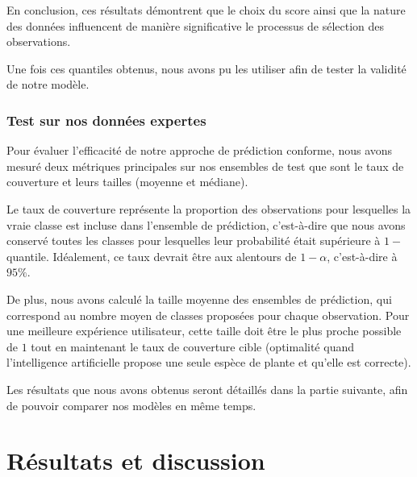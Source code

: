 \documentclass[a4paper,12pt]{article}
\begin{document}
\vspace{0.2cm}

En conclusion, ces résultats démontrent que le choix du score ainsi que la nature des données influencent de manière significative le processus de sélection des observations.

\vspace{0.2cm}

Une fois ces quantiles obtenus, nous avons pu les utiliser afin de tester la validité de notre modèle.

\subsubsection{Test sur nos données expertes}

Pour évaluer l'efficacité de notre approche de prédiction conforme, nous avons mesuré deux métriques principales sur nos ensembles de test que sont le taux de couverture et leurs tailles (moyenne et médiane). 

\vspace{0.2cm}

Le taux de couverture représente la proportion des observations pour lesquelles la vraie classe est incluse dans l'ensemble de prédiction, c'est-à-dire que nous avons conservé toutes les classes pour lesquelles leur probabilité était supérieure à $1 -$ quantile. Idéalement, ce taux devrait être aux alentours de $1- \alpha$, c'est-à-dire à $95\%$.

\vspace{0.2cm}

De plus, nous avons calculé la taille moyenne des ensembles de prédiction, qui correspond au nombre moyen de classes proposées pour chaque observation. Pour une meilleure expérience utilisateur, cette taille doit être le plus proche possible de $1$ tout en maintenant le taux de couverture cible (optimalité quand l'intelligence artificielle propose une seule espèce de plante et qu'elle est correcte).

\vspace{0.2cm}

Les résultats que nous avons obtenus seront détaillés dans la partie suivante, afin de pouvoir comparer nos modèles en même temps.


\section{Résultats et discussion}
\end{document}
